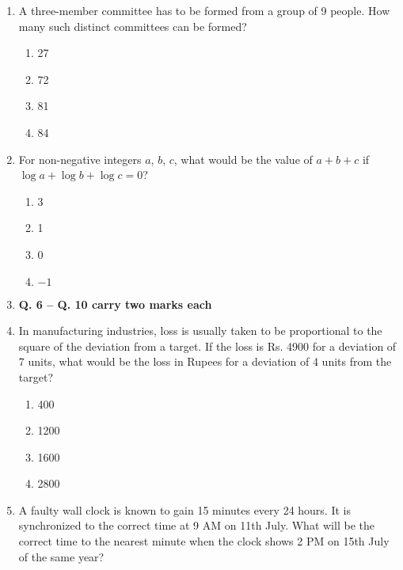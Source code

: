 \documentclass[journal]{IEEEtran}
\begin{document}
\begin{enumerate}
{    }    
    \item {A three-member committee has to be formed from a group of 9 people. How many such distinct committees can be formed?
    	\begin{multicols}{4}
	    	\begin{enumerate}
	    		\item 27
	    		\item 72
	    		\item 81
	    		\item 84
	    	\end{enumerate}
    	\end{multicols}}
    \item {For non-negative integers \(a\), \(b\), \(c\), what would be the value of \(a + b + c\) if \(\log a + \log b + \log c = 0\)?
    	\begin{multicols}{4}
    		\begin{enumerate}
    			\item 3
    			\item 1
    			\item 0
    			\item $-1$
    		\end{enumerate}
    	\end{multicols}
	}
	\item[]{\textbf{Q. 6 – Q. 10 carry two marks each}}
    \item {
    	In manufacturing industries, loss is usually taken to be proportional to the square of the deviation from a target. If the loss is Rs. 4900 for a deviation of 7 units, what would be the loss in Rupees for a deviation of 4 units from the target?
    	
    	
    	\begin{multicols}{4}
    		\begin{enumerate}
    			\item 400 
    			\item 1200 
    			\item 1600
    			\item 2800
    		\end{enumerate}
    	\end{multicols}
    
	}
    \item{
            A faulty wall clock is known to gain 15 minutes every 24 hours. It is synchronized to the correct time at 9 AM on 11th July. What will be the correct time to the nearest minute when the clock shows 2 PM on 15th July of the same year?
            
}
\end{enumerate}
\end{document}
